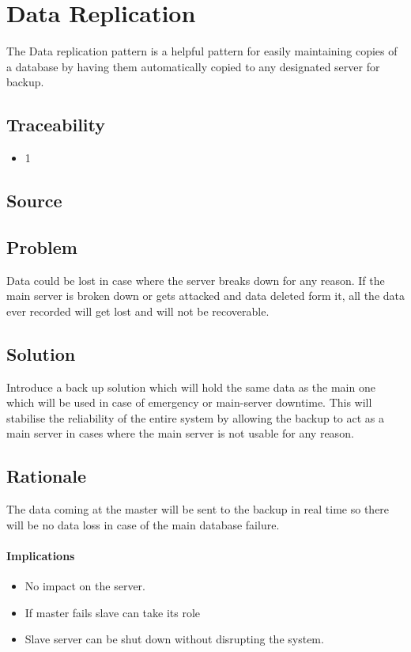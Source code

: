 
\section{Data Replication}

	The Data replication pattern is a helpful pattern for easily maintaining copies of a database by having them automatically copied to any designated server for backup.  

	\subsection{Traceability} 
		\begin{itemize}
			\item 1
		\end{itemize}

	\subsection{Source} \cite{book:design-patterns}

	\subsection{Problem}

	Data could be lost in case where the server breaks down for any reason. If the main server is broken down or gets attacked and data deleted form it, all the data ever recorded will get lost and will not be recoverable. 

	\subsection{Solution} 

	Introduce a back up solution which will hold the same data as the main one which will be used in case of emergency or main-server downtime. This will stabilise the reliability of the entire system by allowing the backup to act as a main server in cases where the main server is not usable for any reason.

	\subsection{Rationale}
	The data coming at the master will be sent to the backup in real time so there will be no data loss in case of the main database failure.

\paragraph{Implications}
\begin{itemize}
	\item No impact on the server.
	\item If master fails slave can take its role
	\item Slave server can be shut down without disrupting the system.
\end{itemize}
